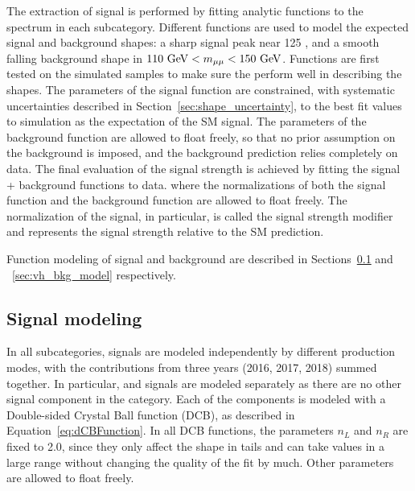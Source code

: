 The extraction of signal is performed by fitting analytic functions to the \mmm spectrum in each subcategory.
Different functions are used to model the expected signal and background shapes: a sharp signal peak near 125 \GeV,
and a smooth falling background shape in $110 ~\mbox{GeV}{} < m_{\mu\mu} < 150 ~\mbox{GeV}{}$.
Functions are first tested on the simulated samples to make sure the perform well in describing the shapes.
The parameters of the signal function are constrained, with systematic uncertainties described in Section~\ref{sec:shape_uncertainty},
to the best fit values to simulation as the expectation of the SM signal.
The parameters of the background function are allowed to float freely, so that no prior assumption on the background is imposed,
and the background prediction relies completely on data.
The final evaluation of the signal strength is achieved by fitting the signal + background functions to data.
where the normalizations of both the signal function and the background function are allowed to float freely.
The normalization of the signal, in particular, is called the signal strength modifier and represents the signal strength relative to the SM prediction.

Function modeling of signal and background are described in Sections~\ref{sec:vh_sig_model} and ~\ref{sec:vh_bkg_model} respectively.

\subsection{Signal modeling}\label{sec:vh_sig_model}
In all subcategories, signals are modeled independently by different production modes,
with the contributions from three years (2016, 2017, 2018) summed together. 
In particular, \qqZH and \ggZH signals are modeled separately as there are no other signal component in the \ZH category.
Each of the components is modeled with a Double-sided Crystal Ball function (DCB), as described in Equation~\ref{eq:dCBFunction}.  
In all DCB functions, the parameters $n_L$ and $n_R$ are fixed to 2.0, 
since they only affect the shape in tails and can take values in a large range without changing the quality of the fit by much. 
Other parameters are allowed to float freely.  

